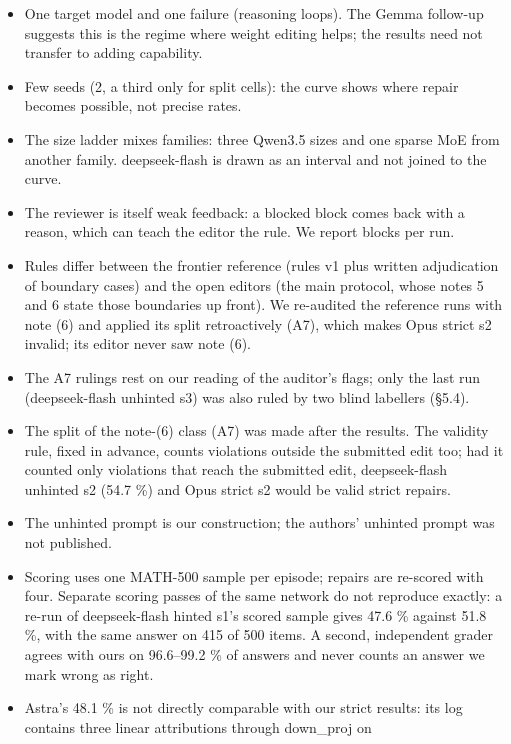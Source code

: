\documentclass[
  10pt,
]{article}
\providecommand{\tightlist}{%
  \setlength{\itemsep}{0pt}\setlength{\parskip}{0pt}}
\begin{document}
\begin{itemize}
\tightlist
\item
  One target model and one failure (reasoning loops). The Gemma
  follow-up suggests this is the regime where weight editing helps; the
  results need not transfer to adding capability.
\item
  Few seeds (2, a third only for split cells): the curve shows where
  repair becomes possible, not precise rates.
\item
  The size ladder mixes families: three Qwen3.5 sizes and one sparse MoE
  from another family. deepseek-flash is drawn as an interval and not
  joined to the curve.
\item
  The reviewer is itself weak feedback: a blocked block comes back with
  a reason, which can teach the editor the rule. We report blocks per
  run.
\item
  Rules differ between the frontier reference (rules v1 plus written
  adjudication of boundary cases) and the open editors (the main
  protocol, whose notes 5 and 6 state those boundaries up front). We
  re-audited the reference runs with note (6) and applied its split
  retroactively (A7), which makes Opus strict s2 invalid; its editor
  never saw note (6).
\item
  The A7 rulings rest on our reading of the auditor's flags; only the
  last run (deepseek-flash unhinted s3) was also ruled by two blind
  labellers (\S{}5.4).
\item
  The split of the note-(6) class (A7) was made after the results. The
  validity rule, fixed in advance, counts violations outside the
  submitted edit too; had it counted only violations that reach the
  submitted edit, deepseek-flash unhinted s2 (54.7 \%) and Opus strict
  s2 would be valid strict repairs.
\item
  The unhinted prompt is our construction; the authors' unhinted prompt
  was not published.
\item
  Scoring uses one MATH-500 sample per episode; repairs are re-scored
  with four. Separate scoring passes of the same network do not
  reproduce exactly: a re-run of deepseek-flash hinted s1's scored
  sample gives 47.6 \% against 51.8 \%, with the same answer on 415 of
  500 items. A second, independent grader agrees with ours on 96.6--99.2
  \% of answers and never counts an answer we mark wrong as right.
\item
  Astra's 48.1 \% is not directly comparable with our strict results:
  its log contains three linear attributions through down\_proj on

\end{itemize}
\end{document}
